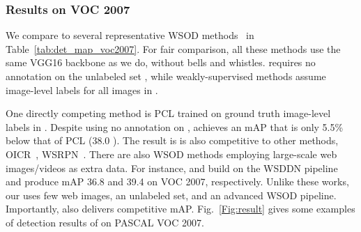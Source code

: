 \subsubsection{Results on VOC 2007}\label{sec:results-voc2007}
We compare to several representative WSOD methods~\cite{wsddn,tang2017cvpr,tang2018eccv,tang2018pami,shen2019cvpr} in Table~\ref{tab:det_map_voc2007}. For fair comparison, all these methods use the same VGG16 backbone as we do, without bells and whistles.
\ours requires no annotation on the unlabeled set , while weakly-supervised methods assume image-level labels for all images in .

One directly competing method is PCL trained on gro\-und truth image-level labels in . Despite using no annotation on , \ours achieves an mAP that is only 5.5\% below that of PCL (38.0 ). The result is is also competitive to other methods, \eg OICR~\cite{tang2017cvpr}, WSRPN~\cite{tang2018pami}. {There are also WSOD methods employing large-scale web images/videos as extra data. For instance, \cite{tao2018tmm} and \cite{singh2019cvpr} build on the WSDDN pipeline~\cite{wsddn} and produce mAP 36.8 and 39.4 on VOC 2007, respectively. Unlike these works, our \ours uses few web images, an unlabeled set, and an advanced WSOD pipeline. Importantly, \ours also delivers competitive mAP.}
Fig.~\ref{Fig:result} gives some examples of detection results of \ours on PASCAL VOC 2007.

 

